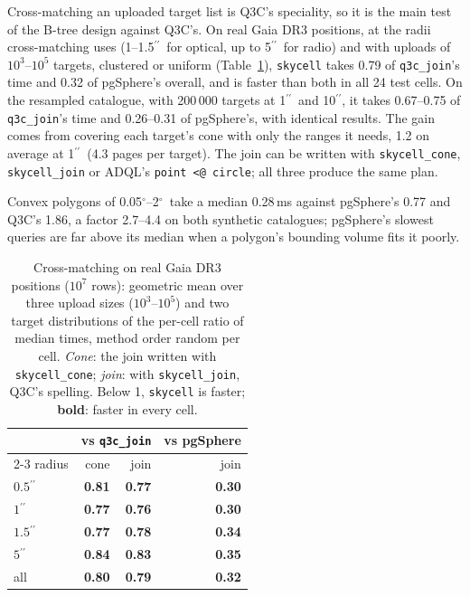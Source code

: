 \documentclass[preprint,12pt]{elsarticle}
\newcommand{\arcsec}{\ensuremath{^{\prime\prime}}}
\newcommand{\degr}{\ensuremath{^{\circ}}}
\begin{document}
Cross-matching an uploaded target list is Q3C's speciality, so it is the main test of
the B-tree design against Q3C's. On real Gaia DR3 positions, at the radii cross-matching
uses (1--1.5\arcsec\ for optical, up to 5\arcsec\ for radio) and with uploads of
$10^3$--$10^5$ targets, clustered or uniform (Table~\ref{tab:xmreal}), \texttt{skycell}
takes 0.79 of \texttt{q3c\_join}'s time and 0.32 of pgSphere's overall, and is faster
than both in all 24 test cells. On the resampled catalogue, with 200\,000 targets at
1\arcsec\ and 10\arcsec, it takes 0.67--0.75 of \texttt{q3c\_join}'s time and
0.26--0.31 of pgSphere's, with identical results. The gain comes from covering each
target's cone with only the ranges it needs, 1.2 on average at 1\arcsec\ (4.3 pages per
target). The join can be written with \texttt{skycell\_cone}, \texttt{skycell\_join} or
ADQL's \texttt{point <@ circle}; all three produce the same plan.

Convex polygons of 0.05\degr--2\degr\ take a median 0.28\,ms against pgSphere's 0.77 and
Q3C's 1.86, a factor 2.7--4.4 on both synthetic catalogues; pgSphere's slowest queries
are far above its median when a polygon's bounding volume fits it poorly.

\begin{table}
  \caption{Cross-matching on real Gaia DR3 positions ($10^7$ rows): geometric mean over
    three upload sizes ($10^3$--$10^5$) and two target distributions of the per-cell
    ratio of median times, method order random per cell. \emph{Cone}: the join written
    with \texttt{skycell\_cone}; \emph{join}: with \texttt{skycell\_join}, Q3C's
    spelling. Below 1, \texttt{skycell} is faster; \textbf{bold}: faster in every cell.}
  \label{tab:xmreal}
  \centering
  \footnotesize
  \begin{tabular}{l rr r}
    \hline\hline
    & \multicolumn{2}{c}{vs \texttt{q3c\_join}} & vs pgSphere \\
    \cline{2-3}\cline{4-4}
    radius & cone & join & join \\
    \hline
    $0.5\arcsec$ & \textbf{0.81} & \textbf{0.77} & \textbf{0.30} \\
    $1\arcsec$   & \textbf{0.77} & \textbf{0.76} & \textbf{0.30} \\
    $1.5\arcsec$ & \textbf{0.77} & \textbf{0.78} & \textbf{0.34} \\
    $5\arcsec$   & \textbf{0.84} & \textbf{0.83} & \textbf{0.35} \\
    \hline
    all          & \textbf{0.80} & \textbf{0.79} & \textbf{0.32} \\
    \hline
  \end{tabular}
\end{table}
\end{document}
